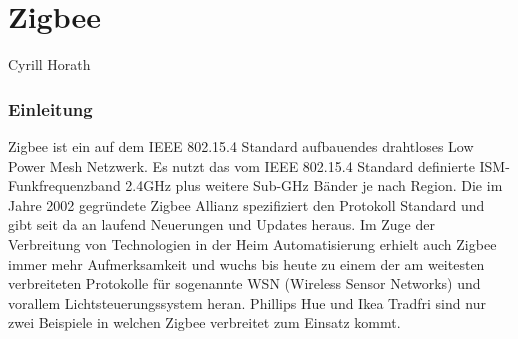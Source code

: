 \vspace*{4cm}
\part{Zigbee}\label{part:Zigbee}
Cyrill Horath
\vspace*{\fill}
\clearpage

\section{Einleitung}\label{sec:EinleitungZigbee}

Zigbee ist ein auf dem IEEE 802.15.4 Standard aufbauendes drahtloses Low Power Mesh Netzwerk. Es nutzt das vom IEEE 802.15.4 Standard definierte ISM-Funkfrequenzband 2.4GHz plus weitere Sub-GHz Bänder je nach Region.
Die im Jahre 2002 gegründete Zigbee Allianz spezifiziert den Protokoll Standard und gibt seit da an laufend Neuerungen und Updates heraus.
Im Zuge der Verbreitung von Technologien in der Heim Automatisierung erhielt auch Zigbee immer mehr Aufmerksamkeit und wuchs bis heute zu einem der am weitesten verbreiteten Protokolle für sogenannte WSN (Wireless Sensor Networks) und vorallem Lichtsteuerungssystem heran. Phillips Hue und Ikea Tradfri sind nur zwei Beispiele in welchen Zigbee verbreitet zum Einsatz kommt.




